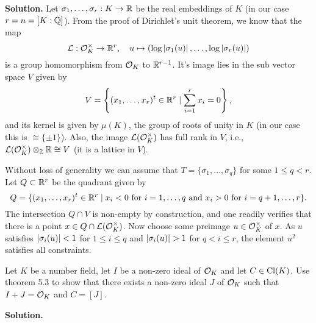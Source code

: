 \documentclass[a4paper,11pt]{article}
\begin{document}
\textbf{Solution.} 
Let $\sigma_1, \dots, \sigma_r: K \to \mathbb{R}$
be the real embeddings of $K$ (in our case $r = n = [K : \mathbb{Q}]$). 
From the proof of Dirichlet's unit theorem, we know that the map
\begin{equation*}
    \mathcal{L}: \mathcal{O}_K^\times \to \mathbb{R}^{r}, \quad u \mapsto (\log \left\lvert \sigma_1(u) \right\rvert, \dots, \log \left\lvert \sigma_r(u) \right\rvert)
\end{equation*}
is a group homomorphism from $\mathcal{O}_K$ to $\mathbb{R}^{r-1}$. It's image lies in the sub vector
space $V$ given by 
\begin{equation*}
    V = \left\{(x_1, \dots, x_r)^t \in \mathbb{R}^r \mid \sum_{i = 1}^r x_i = 0\right\},
\end{equation*}
and its kernel is given by $\mu(K)$, the group of roots of unity in $K$ (in our case this
is $\cong \{\pm 1\}$). Also, the image $\mathcal{L}(\mathcal{O}_K^\times)$ has full rank in 
$V$, i.e., $\mathcal{L}(\mathcal{O}_K^\times) \otimes_{\mathbb{Z}} \mathbb{R} \cong V$ (it is a lattice in $V$). 

Without loss of generality we can assume that 
$T = \{\sigma_1, \dots, \sigma_q\}$ for some $1 \leq q < r$. Let $Q \subset
\mathbb{R}^r$ be the quadrant given by
\begin{equation*}
    Q = \{(x_1, \dots, x_r)^t \in \mathbb{R}^r \mid x_i < 0 \text{ for }i = 1, \dots, q
    \text{ and }x_i > 0 \text{ for } i = q+1, \dots, r \}.
\end{equation*}
The intersection $Q \cap V$ is non-empty by construction, and one readily verifies that
there is a point $x \in Q \cap \mathcal{L}(\mathcal{O}_K^\times)$. Now choose some preimage
$u \in \mathcal{O}_K^\times$ of $x$. As $u$ satisfies $\left\lvert \sigma_i(u) \right\rvert < 1$ for 
$1 \leq i \leq q$ and $\left\lvert \sigma_i(u) \right\rvert > 1$ for $q < i \leq r$,
the element $u^2$ satisfies all constraints.

Let $K$ be a number field, let $I$ be a non-zero ideal of $\mathcal{O}_K$ and let $C \in \operatorname{Cl}(K)$. Use
theorem 5.3 to show that there exists a non-zero ideal $J$ of $\mathcal{O}_K$ such that $I + J = \mathcal{O}_K$ and
$C = [J]$. 

\textbf{Solution.}

\contactend
\end{document}
